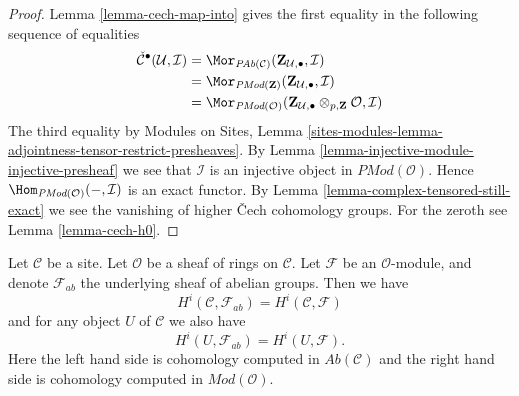 \begin{proof}
Lemma \ref{lemma-cech-map-into} gives the first equality in the following
sequence of equalities
\begin{align*}
\check{\mathcal{C}}^\bullet(\mathcal{U}, \mathcal{I})
& =
\Mor_{\textit{PAb}(\mathcal{C})}(
\mathbf{Z}_{\mathcal{U}, \bullet}, \mathcal{I}) \\
& =
\Mor_{\textit{PMod}(\mathbf{Z})}(
\mathbf{Z}_{\mathcal{U}, \bullet}, \mathcal{I}) \\
& =
\Mor_{\textit{PMod}(\mathcal{O})}(
\mathbf{Z}_{\mathcal{U}, \bullet} \otimes_{p, \mathbf{Z}} \mathcal{O},
\mathcal{I})
\end{align*}
The third equality by
Modules on Sites,
Lemma \ref{sites-modules-lemma-adjointness-tensor-restrict-presheaves}.
By Lemma \ref{lemma-injective-module-injective-presheaf}
we see that $\mathcal{I}$ is an injective object in
$\textit{PMod}(\mathcal{O})$.
Hence $\Hom_{\textit{PMod}(\mathcal{O})}(-, \mathcal{I})$
is an exact functor. By
Lemma \ref{lemma-complex-tensored-still-exact} we see the vanishing of
higher {\v C}ech cohomology groups.
For the zeroth see Lemma \ref{lemma-cech-h0}.
\end{proof}

\begin{lemma}
\label{lemma-cohomology-modules-abelian-agree}
Let $\mathcal{C}$ be a site.
Let $\mathcal{O}$ be a sheaf of rings on $\mathcal{C}$.
Let $\mathcal{F}$ be an $\mathcal{O}$-module, and denote
$\mathcal{F}_{ab}$ the underlying sheaf of abelian groups.
Then we have
$$
H^i(\mathcal{C}, \mathcal{F}_{ab})
=
H^i(\mathcal{C}, \mathcal{F})
$$
and for any object $U$ of $\mathcal{C}$ we also have
$$
H^i(U, \mathcal{F}_{ab})
=
H^i(U, \mathcal{F}).
$$
Here the left hand side is cohomology computed in
$\textit{Ab}(\mathcal{C})$ and the right hand side
is cohomology computed in $\textit{Mod}(\mathcal{O})$.
\end{lemma}

